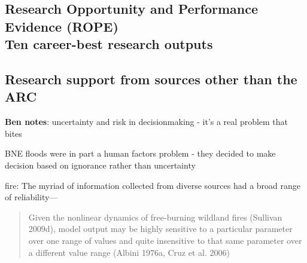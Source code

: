 \documentclass[a4paper,fontsize=12pt]{scrartcl}
\begin{document}
\newpage
\subsection{Research Opportunity and Performance Evidence (ROPE)\\
  Ten career-best research outputs}
\label{sec:ten-best-outputs}



\newpage
\setcounter{section}{7} %
\setcounter{subsection}{0}
\subsection{Research support from sources other than the ARC}
\label{sec:other-research-support}



\appendix
\newpage


\textbf{Ben notes}: uncertainty and risk in decisionmaking - it's a
real problem that bites

BNE floods were in part a human factors problem - they decided to make
decision based on ignorance rather than uncertainty

fire: The myriad of information collected from diverse sources had a broad
range of reliability---\parencite{cruz_anatomy_2012}

\blockquote[\parencite{alexander_limitations_2013}]{Given the nonlinear
  dynamics of free-burning wildland fires (Sullivan 2009d), model
  output may be highly sensitive to a particular parameter over one
  range of values and quite insensitive to that same parameter over a
  different value range (Albini 1976a, Cruz et al. 2006)}
\end{document}

